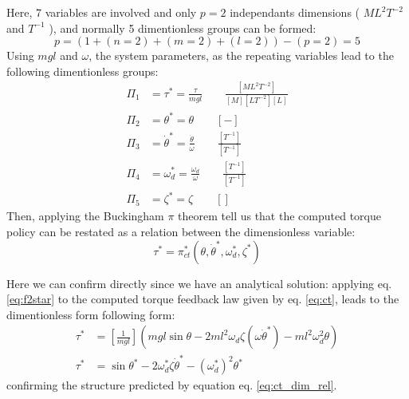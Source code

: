 Here, 7 variables are involved and only $p=2$ independants dimensions ( $ML^2T^{-2}$ and $T^{-1}$ ), and normally 5 dimentionless groups can be formed:
\begin{equation}
p = ( 1 + (n=2) + (m=2) + (l=2)) - ( p = 2 ) = 5
\end{equation}
Using $mgl$ and $\omega$, the system parameters, as the repeating variables lead to the following dimentionless groups:
\begin{align}
\Pi_1 &= \tau^* = \frac{\tau}{mgl} \quad \quad \frac{[ML^2T^{-2}]}{[M][LT^{-2}][L]} \\
\Pi_2 &= \theta^* = \theta \quad \quad [-]\\
\Pi_3 &= \dot{\theta}^* = \frac{ \dot{\theta}  }{ \omega } \quad \quad \frac{[T^{-1}]}{[T^{-1}]} \\
\Pi_4 &= \omega_d^* = \frac{\omega_d}{\omega} \quad \quad \frac{[T^{-1}]}{[T^{-1}]} \\
\Pi_5 &= \zeta^* = \zeta \quad \quad []
\end{align}
Then, applying the Buckingham $\pi$ theorem tell us that the computed torque policy can be restated as a relation between the dimensionless variable:
\begin{equation}
\tau^*
=
\pi^*_{ct} \left(
\theta, \dot{\theta}^*,
\omega_d^* , \zeta^* 
\right)
\label{eq:ct_dim_rel}
\end{equation}

Here we can confirm directly since we have an analytical solution: applying eq. \eqref{eq:f2star} to the computed torque feedback law given by eq. \eqref{eq:ct}, leads to the dimentionless form following form:
\begin{align}
\tau^* &= \left[ \frac{1}{mgl} \right] \left( mgl \sin \theta - 2 m l^2 \omega_d \zeta \left( \omega \dot{\theta}^*\right) - m l^2 \omega_d^2 \theta \right) \\
\tau^*
&=
\sin \theta^*
- 2 \omega_d^* \zeta \dot{\theta}^* 
- (\omega_d^*)^2 \theta^*
\end{align}
confirming the structure predicted by equation eq. \eqref{eq:ct_dim_rel}.

